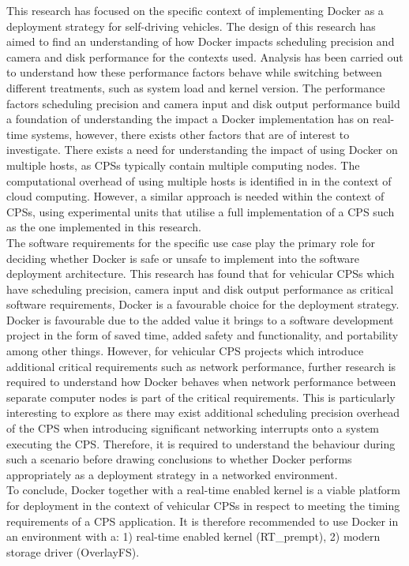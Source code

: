 This research has focused on the specific context of implementing Docker as a deployment strategy for self-driving vehicles. The design of this research has aimed to find an understanding of how Docker impacts scheduling precision and camera and disk performance for the contexts used. Analysis has been carried out to understand how these performance factors behave while switching between different treatments, such as system load and kernel version. The performance factors scheduling precision and camera input and disk output performance build a foundation of understanding the impact a Docker implementation has on real-time systems, however, there exists other factors that are of interest to investigate. There exists a need for understanding the impact of using Docker on multiple hosts, as CPSs typically contain multiple computing nodes. The computational overhead of using multiple hosts is identified in \cite{p1} in the context of cloud computing. However, a similar approach is needed within the context of CPSs, using experimental units that utilise a full implementation of a CPS such as the one implemented in this research.\\

The software requirements for the specific use case play the primary role for deciding whether Docker is safe or unsafe to implement into the software deployment architecture. This research has found that for vehicular CPSs which have scheduling precision, camera input and disk output performance as critical software requirements, Docker is a favourable choice for the deployment strategy. Docker is favourable due to the added value it brings to a software development project in the form of saved time, added safety and functionality, and portability among other things. However, for vehicular CPS projects which introduce additional critical requirements such as network performance, further research is required to understand how Docker behaves when network performance between separate computer nodes is part of the critical requirements. This is particularly interesting to explore as there may exist additional scheduling precision overhead of the CPS when introducing significant networking interrupts onto a system executing the CPS. Therefore, it is required to understand the behaviour during such a scenario before drawing conclusions to whether Docker performs appropriately as a deployment strategy in a networked environment.\\

To conclude, Docker together with a real-time enabled kernel is a viable platform for deployment in the context of vehicular CPSs in respect to meeting the timing requirements of a CPS application. It is therefore recommended to use Docker in an environment with a: 1) real-time enabled kernel (RT\_prempt), 2) modern storage driver (OverlayFS).